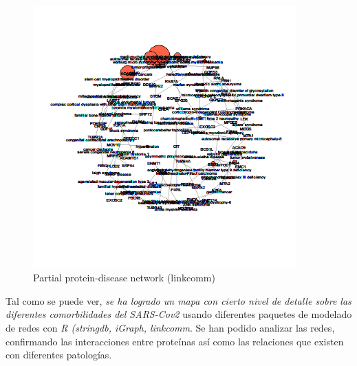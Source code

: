 	\begin{figure}[h!]
		\includegraphics[width=0.9\textwidth]{figures/figuraLinkcomm.png}
		\caption{Partial protein-disease network (linkcomm)}
		\label{fig:ppi_linkcomm}
	\end{figure}
	
Tal como se puede ver, \emph{se ha logrado un mapa con cierto nivel de detalle sobre las diferentes comorbilidades del SARS-Cov2} usando diferentes paquetes de modelado de redes con \textit{R (stringdb, iGraph, linkcomm}. Se han podido analizar las redes, confirmando las interacciones entre proteínas así como las relaciones que existen con diferentes patologías.